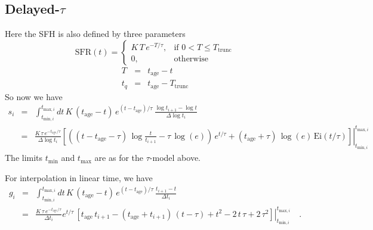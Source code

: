 \documentclass[12pt, letterpaper, preprint]{aastex}
\newcommand{\tmin}[1][]{t_{\mathrm{min} #1}}
\newcommand{\tmax}[1][]{t_{\mathrm{max} #1}}
\newcommand{\dlt}{\Delta\log t_i}
\newcommand{\dt}{\Delta t_i}
\newcommand{\tintegral}{\int_{\tmin[,i]}^{\tmax[,i]} dt}
\newcommand{\tinterval}{\right|_{\tmin[,i]}^{\tmax[,i]}}
\newcommand{\sftrunc}{T_{\mathrm{trunc}}}
\newcommand{\tage}{t_{\mathrm{age}}}
\begin{document}
\subsection{Delayed-$\tau$}
Here the SFH is also defined by three parameters
\[ 
\mathrm{SFR}(t) = 
\begin{cases}
K \, T \, e^{-T/\tau}, &  \text{if } 0 < T \leq \sftrunc\\
0, & \text{otherwise}
\end{cases}
\]
\begin{eqnarray}
T & = & \tage - t \nonumber \\
t_q & = & \tage - \sftrunc\nonumber
\end{eqnarray}
So now we have
\begin{eqnarray}
s_i  & = & \tintegral \, K \, (\tage-t) \, e^{(t-\tage) /\tau}\, \frac{\log t_{i+1} - \log t}{\dlt}  \nonumber \\
 & = & \frac{K \, \tau \,  e^{-\tage/\tau}}{\dlt} \left. \left[\left((t - \tage - \tau) \, \log \frac{t}{t_{i+1}} - \tau \, \log (e) \right) \, e^{t/\tau}    + (\tage + \tau) \, \log (e) \, \mathrm{Ei}(t/\tau) \right]\tinterval %
\end{eqnarray}
The limits $\tmin$ and $\tmax$ are as for the $\tau$-model above.

For interpolation in linear time, we have
\begin{eqnarray}
g_i  & = & \tintegral \, K \, (\tage-t) \, e^{(t-\tage) /\tau}\, \frac{t_{i+1} - t}{\dt}  \nonumber \\
     & = & \frac{K \, \tau \, e^{-\tage/\tau}}{\dt} \left. e^{t/\tau} \, \left[ \tage \, t_{i+1} - (\tage + t_{i+1})\, (t-\tau) + t^2 - 2\, t\, \tau + 2\, \tau^2\right] \tinterval \quad .
\end{eqnarray}
\end{document}
